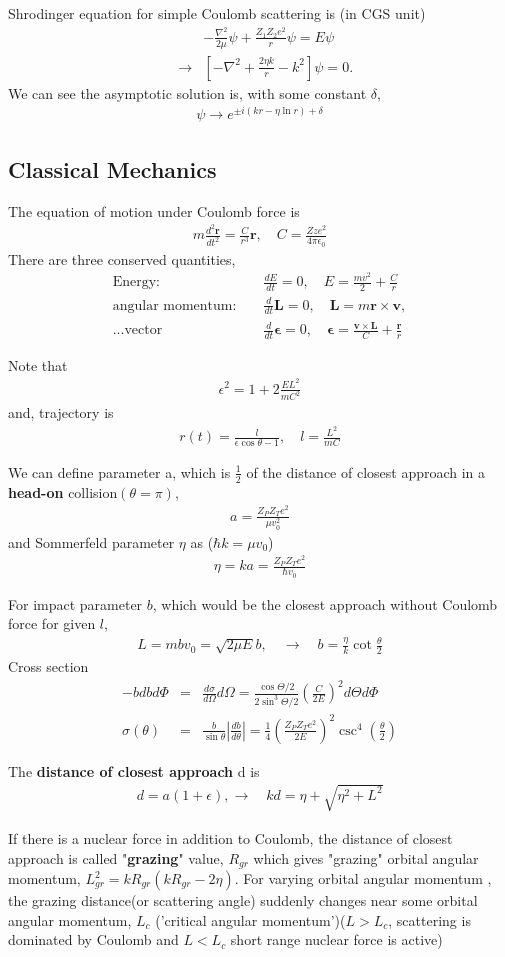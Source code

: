 \documentclass[10pt]{book}
\def\bm{\boldsymbol}
\newcommand{\bea}{\begin{eqnarray}}
\newcommand{\eea}{\end{eqnarray}}
\newcommand{\no}{\nonumber \\}
\def\vr{{\bm r}}
\begin{document}
Shrodinger equation for simple Coulomb scattering is (in CGS unit)
\bea
& &-\frac{\nabla^2}{2\mu}\psi+\frac{Z_1 Z_2 e^2}{r}\psi=E\psi\no 
&\to& \left[-\nabla^2+\frac{2 \eta k}{r}-k^2\right]\psi=0.
\eea
We can see the asymptotic solution is, with some constant $\delta$,
\bea
\psi\to e^{\pm i (kr-\eta \ln r)+\delta}
\eea

\subsection{Classical Mechanics}
The equation of motion under Coulomb force is 
\bea 
m\frac{d^2\vr}{dt^2}=\frac{C}{r^3}\vr ,\quad C=\frac{Zz e^2}{4\pi\epsilon_0}
\eea 
There are three conserved quantities,
\bea 
\mbox{Energy: }& &\frac{dE}{dt}=0,\quad E=\frac{mv^2}{2}+\frac{C}{r}\no 
\mbox{angular momentum: }& &\frac{d}{dt}{\bm L}=0,\quad {\bm L}=m\vr\times{\bm v},\no 
\mbox{...vector}& &\frac{d}{dt}{\bm \epsilon}=0,\quad {\bm \epsilon}=\frac{{ \bm v}\times{\bm L}}{C}+\frac{\vr}{r}
\eea 

Note that
\bea 
\epsilon^2=1+2\frac{EL^2}{mC^2}
\eea 
and, trajectory is
\bea
r(t)=\frac{l}{\epsilon\cos\theta-1},\quad l=\frac{L^2}{mC}
\eea 

We can define parameter a, which is $\frac{1}{2}$ of the distance of closest approach 
in a {\bf head-on} collision$(\theta=\pi)$,
\bea 
a=\frac{Z_P Z_T e^2}{\mu v_0^2}
\eea 
and Sommerfeld parameter $\eta$ as ($\hbar k=\mu v_0$)
\bea 
\eta= k a =\frac{Z_P Z_T e^2}{\hbar v_0} 
\eea 

For impact parameter $b$, which would be the closest approach without Coulomb force for given $l$, 
\bea 
L=mbv_0=\sqrt{2\mu E} b,\quad 
\rightarrow \quad b=\frac{\eta}{k}\cot\frac{\theta}{2}
\eea 
Cross section
\bea 
-bdbd\Phi &=&\frac{d\sigma}{d\Omega}d\Omega =\frac{\cos\Theta/2}{2\sin^3\Theta/2}(\frac{C}{2E})^2 d\Theta d\Phi \no 
\sigma(\theta)&=&\frac{b}{\sin\theta}|\frac{db}{d\theta}|
                =\frac{1}{4}(\frac{Z_P Z_T e^2}{2E})^2\csc^4(\frac{\theta}{2})   
\eea 

The {\bf distance of closest approach} d is 
\bea 
d=a(1+\epsilon),\to \quad kd=\eta+\sqrt{\eta^2+L^2} 
\eea 

If there is a nuclear force in addition to Coulomb, the distance of closest approach
is called "{\bf grazing}" value, $R_{gr}$ which gives "grazing" orbital angular momentum,
$L^2_{gr}=k R_{gr}(k R_{gr}-2\eta)$. 
For varying orbital angular momentum , 
the grazing distance(or scattering angle)
 suddenly changes near some orbital angular momentum, $L_c$ ('critical
angular momentum')($L>L_c$, scattering  is dominated by 
Coulomb and $L<L_c$ short range nuclear force is active)
\end{document}
